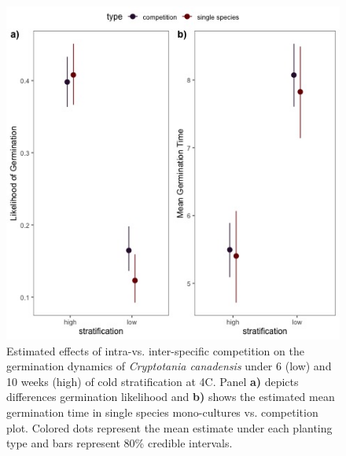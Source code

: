 \documentclass{article}\usepackage[]{graphicx}\usepackage[]{color}
\begin{document}
{\begin{figure}[h!]
    \centering
\includegraphics[width=\textwidth]{..//figure/nichemodfication.jpeg}
   \caption{Estimated effects of intra-vs. inter-specific competition on the germination dynamics of \textit{Cryptotania canadensis} under 6 (low) and 10 weeks (high) of cold stratification at 4\degree C. Panel \textbf{a)} depicts differences germination likelihood and \textbf{b)} shows the estimated mean germination time in single species mono-cultures vs. competition plot. Colored dots represent the mean estimate under each planting type and bars represent 80\% credible intervals. } 
   \label{fig:nichemod}
\end{figure}

}
\end{document}

